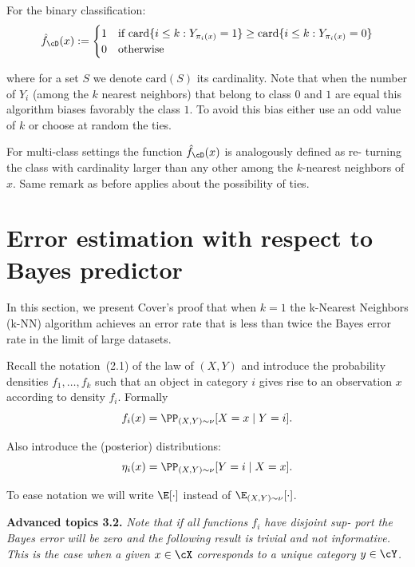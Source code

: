 For the binary classification:
\begin{equation}\label{eq:ch3-classification}
\hat{f}_{\cD}(x) :=
\begin{cases}
1 & \text{if } \mathrm{card}\{i \leq k : Y_{\pi_i(x)} = 1\} \geq \mathrm{card}\{i \leq k : Y_{\pi_i(x)} = 0\} \\
0 & \text{otherwise}
\end{cases}
\end{equation}

where for a set $S$ we denote $\mathrm{card}(S)$ its cardinality. Note that when the number
of $Y_i$ (among the $k$ nearest neighbors) that belong to class $0$ and $1$ are equal
this algorithm biases favorably the class $1$. To avoid this bias either use an
odd value of $k$ or choose at random the ties.

For multi-class settings the function $\hat{f}_{\cD}(x)$ is analogously defined as re-
turning the class with cardinality larger than any other among the $k$-nearest
neighbors of $x$. Same remark as before applies about the possibility of ties.

\section{Error estimation with respect to Bayes predictor}
\label{sec:ch3-error-bayes}

In this section, we present Cover's proof \cite{turinici5} that when $k = 1$ the k-Nearest
Neighbors (k-NN) algorithm achieves an error rate that is less than twice the
Bayes error rate in the limit of large datasets.

Recall the notation~(2.1) of the law of $(X, Y)$ and introduce the probability
densities $f_1, \ldots, f_k$ such that an object in category $i$ gives rise to an observation
$x$ according to density $f_i$. Formally
\begin{equation}\label{eq:ch3-fi}
f_i(x) = \PP_{(X,Y) \sim \nu}[X = x \mid Y = i].
\end{equation}

Also introduce the (posterior) distributions:
\begin{equation}\label{eq:ch3-etai}
\eta_i(x) = \PP_{(X,Y) \sim \nu}[Y = i \mid X = x].
\end{equation}

To ease notation we will write $\E[\cdot]$ instead of $\E_{(X,Y) \sim \nu}[\cdot]$.

\begin{tcolorbox}[advancedbox]
\textbf{Advanced topics 3.2.} \textit{Note that if all functions $f_i$ have disjoint sup-
port the Bayes error will be zero and the following result is trivial and
not informative. This is the case when a given $x \in \cX$ corresponds to a
unique category $y \in \cY$.}
\end{tcolorbox}

